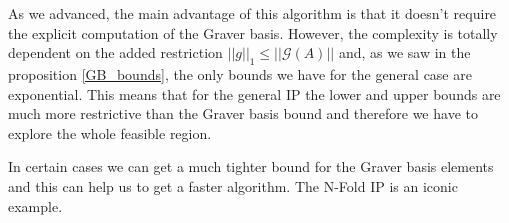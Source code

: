 As we advanced, the main advantage of this algorithm is that it doesn't require the explicit computation of the Graver basis. However, the complexity is totally dependent on the added restriction $||g||_1 \leq ||\mathcal{G}(A)||$ and, as we saw in the proposition \ref{GB_bounds}, the only bounds we have for the general case are exponential. This means that for the general IP the lower and upper bounds are much more restrictive than the Graver basis bound and therefore we have to explore the whole feasible region.

In certain cases we can get a much tighter bound for the Graver basis elements and this can help us to get a faster algorithm. The N-Fold IP is an iconic example.